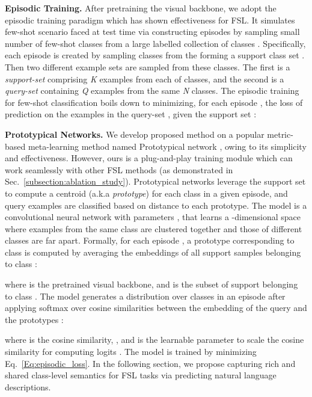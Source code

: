 \documentclass{bmvc2k}
\begin{document}
\vspace{-2em}


\noindent \textbf{Episodic Training.} After pretraining the visual backbone, we adopt the episodic training paradigm which has shown effectiveness for FSL. It simulates few-shot scenario faced at test time via constructing episodes by sampling small number of few-shot classes from a large labelled collection of classes . Specifically, each episode is created by  sampling  classes from the  forming a support class set . Then two different example sets are sampled from these classes. The first is a \textit{support-set}  comprising \textit{K} examples from each of  classes, and the second is a \textit{query-set}  containing \textit{Q} examples from the same \textit{N} classes. The episodic training for few-shot classification boils down to minimizing, for each episode , the loss of prediction on the examples in the query-set , given the support set : 
\vspace{-0.2cm}


\noindent \textbf{Prototypical Networks.} We develop proposed method on a popular metric-based meta-learning method named Prototypical network \cite{snell2017prototypical}, owing to its simplicity and effectiveness. However, ours is a plug-and-play training module which can work seamlessly with other FSL methods (as demonstrated in Sec.~\ref{subsection:ablation_study}). Prototypical networks leverage the support set to compute a centroid (a.k.a \emph{prototype}) for each class in a given episode, and query examples are classified based on distance to each prototype. The model is a convolutional neural network with parameters , that learns a -dimensional space where examples from the same class are clustered together and those of different classes are far apart. Formally, for each episode , a prototype  corresponding to class  is computed by averaging the embeddings of all support samples belonging to class :



\noindent where  is the pretrained visual backbone, and  is the subset of support belonging to class . The model generates a distribution over  classes in an episode after applying softmax over cosine similarities between the embedding of the query  and the prototypes :

\noindent where  is the cosine similarity, , and  is the learnable parameter to scale the cosine similarity for computing logits \cite{chen2020new}. The model is trained by minimizing Eq.~\ref{Eq:episodic_loss}.
In the following section, we propose capturing rich and shared class-level semantics for FSL tasks via predicting natural language descriptions.
\end{document}
